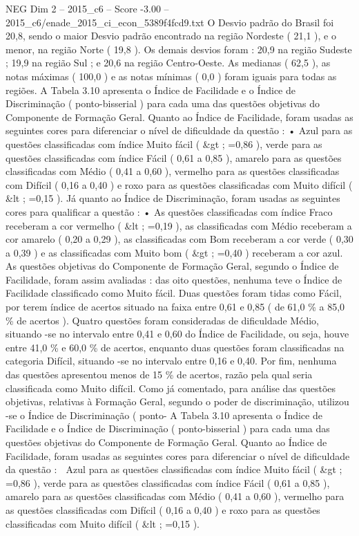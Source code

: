 \begin{textsample}{NEG Dim 2 – 2015\_c6 – Score -3.00 – 2015\_c6/enade\_2015\_ci\_econ\_5389f4fcd9.txt}
O Desvio padrão do Brasil foi 20,8, sendo o maior Desvio padrão encontrado na região Nordeste ( 21,1 ), e o menor, na região Norte ( 19,8 ).
Os demais desvios foram : 20,9 na região Sudeste ; 19,9 na região Sul ; e 20,6 na região Centro-Oeste.
As medianas ( 62,5 ), as notas máximas ( 100,0 ) e as notas mínimas ( 0,0 ) foram iguais para todas as regiões.
A Tabela 3.10 apresenta o Índice de Facilidade e o Índice de Discriminação ( ponto-bisserial ) para cada uma das questões objetivas do Componente de Formação Geral.
Quanto ao Índice de Facilidade, foram usadas as seguintes cores para diferenciar o nível de dificuldade da questão : • Azul para as questões classificadas com índice Muito fácil ( \&gt ; =0,86 ), verde para as questões classificadas com índice Fácil ( 0,61 a 0,85 ), amarelo para as questões classificadas com Médio ( 0,41 a 0,60 ), vermelho para as questões classificadas com Difícil ( 0,16 a 0,40 ) e roxo para as questões classificadas com Muito difícil ( \&lt ; =0,15 ).
Já quanto ao Índice de Discriminação, foram usadas as seguintes cores para qualificar a questão : • As questões classificadas com índice Fraco receberam a cor vermelho ( \&lt ; =0,19 ), as classificadas com Médio receberam a cor amarelo ( 0,20 a 0,29 ), as classificadas com Bom receberam a cor verde ( 0,30 a 0,39 ) e as classificadas com Muito bom ( \&gt ; =0,40 ) receberam a cor azul.
As questões objetivas do Componente de Formação Geral, segundo o Índice de Facilidade, foram assim avaliadas : das oito questões, nenhuma teve o Índice de Facilidade classificado como Muito fácil.
Duas questões foram tidas como Fácil, por terem índice de acertos situado na faixa entre 0,61 e 0,85 ( de 61,0 \% a 85,0 \% de acertos ).
Quatro questões foram consideradas de dificuldade Médio, situando -se no intervalo entre 0,41 e 0,60 do Índice de Facilidade, ou seja, houve entre 41,0 \% e 60,0 \% de acertos, enquanto duas questões foram classificadas na categoria Difícil, situando -se no intervalo entre 0,16 e 0,40.
Por fim, nenhuma das questões apresentou menos de 15 \% de acertos, razão pela qual seria classificada como Muito difícil.
Como já comentado, para análise das questões objetivas, relativas à Formação Geral, segundo o poder de discriminação, utilizou -se o Índice de Discriminação ( ponto- A Tabela 3.10 apresenta o Índice de Facilidade e o Índice de Discriminação ( ponto-bisserial ) para cada uma das questões objetivas do Componente de Formação Geral.
Quanto ao Índice de Facilidade, foram usadas as seguintes cores para diferenciar o nível de dificuldade da questão :  Azul para as questões classificadas com índice Muito fácil ( \&gt ; =0,86 ), verde para as questões classificadas com índice Fácil ( 0,61 a 0,85 ), amarelo para as questões classificadas com Médio ( 0,41 a 0,60 ), vermelho para as questões classificadas com Difícil ( 0,16 a 0,40 ) e roxo para as questões classificadas com Muito difícil ( \&lt ; =0,15 ).

\end{textsample}
